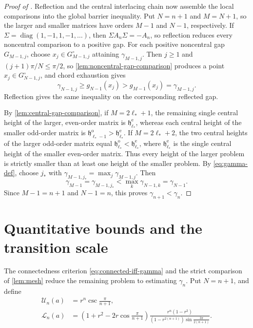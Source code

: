 \documentclass[preprints,article,accept,oneauthor]{Definitions/mdpi}
\numberwithin{equation}{section}
\theoremstyle{mdpi}
\theoremstyle{definition}
\DeclareMathOperator{\diag}{diag}
\begin{document}
\begin{proof}[Proof of ]
Reflection and the central interlacing chain now assemble the local
comparisons into the global barrier inequality.  Put \(N=n+1\) and
\(M=N+1\), so the
larger and smaller matrices have orders \(M-1\) and \(N-1\), respectively.  If
\(\Sigma=\diag(1,-1,1,-1,\ldots)\), then
\(\Sigma A_n\Sigma=-A_n\), so reflection reduces every noncentral
comparison to a positive gap.  For each positive noncentral gap
\(G_{M-1,j}\), choose
\(x_j\in G_{M-1,j}^{\circ}\) attaining \(\gamma_{M-1,j}\).  Then
\(j\geq1\) and \((j+1)\pi/N\leq\pi/2\), so
\cref{lem:noncentral-gap-comparison} produces a point
\(\widehat x_j\in G_{N-1,j}^{\circ}\), and chord exhaustion gives
\[
 \gamma_{N-1,j}\geq g_{N-1}(\widehat x_j)
 >g_{M-1}(x_j)=\gamma_{M-1,j}.
\]
Reflection gives the same inequality on the corresponding reflected gap.

By \cref{lem:central-gap-comparison}, if \(M=2\ell_*+1\), the remaining
single central height of the larger, even-order matrix is
\(\mathfrak h_{\ell_*}^{\mathrm e}\),
whereas each central height of the
smaller odd-order matrix is
\(\mathfrak h_{\ell_*-1}^{\mathrm o}>\mathfrak h_{\ell_*}^{\mathrm e}\).  If
\(M=2\ell_*+2\), the two central heights of the larger odd-order matrix
equal
\(\mathfrak h_{\ell_*}^{\mathrm o}<\mathfrak h_{\ell_*}^{\mathrm e}\),
where \(\mathfrak h_{\ell_*}^{\mathrm e}\) is the single
central height of the smaller even-order matrix.
Thus every height of the larger problem is strictly smaller than at
least one height of the smaller problem.  By \eqref{eq:gamma-def}, choose
\(j_*\) with
\(\gamma_{M-1,j_*}=\max_j\gamma_{M-1,j}\).  Then
\[
 \gamma_{M-1}=\gamma_{M-1,j_*}
 <\max_k\gamma_{N-1,k}=\gamma_{N-1}.
\]
Since \(M-1=n+1\) and \(N-1=n\), this proves
\(\gamma_{n+1}<\gamma_n\).
\end{proof}



\section{Quantitative bounds and the transition scale}
\label{sec:topology-bounds}

The connectedness criterion \eqref{eq:connected-iff-gamma} and the strict
comparison of \cref{lem:mesh} reduce the remaining problem to estimating
\(\gamma_n\).  Put \(N=n+1\), and define
\begin{align}
 \mathcal U_n(a)&=r^n\csc\frac{\pi}{n+1},\label{eq:main-U-def}\\
 \mathcal L_n(a)&=
 \left(1+r^2-2r\cos\frac{\pi}{n+1}\right)
 \frac{r^n(1-r^2)}
 {(1-r^{2(n+1)})\sin\frac{3\pi}{2(n+1)}}.\label{eq:main-L-def}
\end{align}
\end{document}
